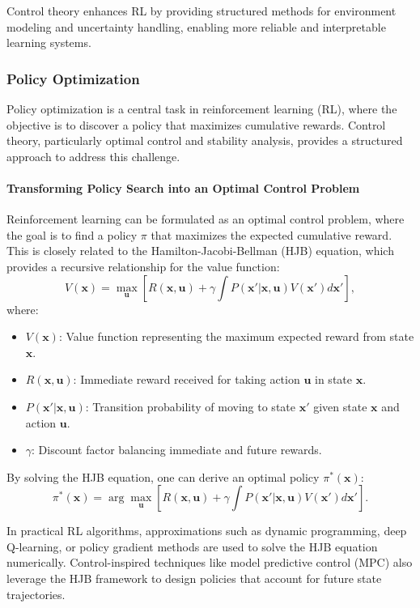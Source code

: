 \documentclass{IEEEojcsys}
\begin{document}
Control theory enhances RL by providing structured methods for environment modeling and uncertainty handling, enabling more reliable and interpretable learning systems.

\subsubsection{Policy Optimization}
Policy optimization is a central task in reinforcement learning (RL), where the objective is to discover a policy that maximizes cumulative rewards. Control theory, particularly optimal control and stability analysis, provides a structured approach to address this challenge.

\paragraph{Transforming Policy Search into an Optimal Control Problem}
Reinforcement learning can be formulated as an optimal control problem, where the goal is to find a policy $\pi$ that maximizes the expected cumulative reward. This is closely related to the Hamilton-Jacobi-Bellman (HJB) equation, which provides a recursive relationship for the value function:
\[
V(\mathbf{x}) = \max_{\mathbf{u}} \left[ R(\mathbf{x}, \mathbf{u}) + \gamma \int P(\mathbf{x}'|\mathbf{x}, \mathbf{u}) V(\mathbf{x}') d\mathbf{x}' \right],
\]
where:
\begin{itemize}
    \item $V(\mathbf{x})$: Value function representing the maximum expected reward from state $\mathbf{x}$.
    \item $R(\mathbf{x}, \mathbf{u})$: Immediate reward received for taking action $\mathbf{u}$ in state $\mathbf{x}$.
    \item $P(\mathbf{x}'|\mathbf{x}, \mathbf{u})$: Transition probability of moving to state $\mathbf{x}'$ given state $\mathbf{x}$ and action $\mathbf{u}$.
    \item $\gamma$: Discount factor balancing immediate and future rewards.
\end{itemize}

By solving the HJB equation, one can derive an optimal policy $\pi^*(\mathbf{x})$:
\[
\pi^*(\mathbf{x}) = \arg\max_{\mathbf{u}} \left[ R(\mathbf{x}, \mathbf{u}) + \gamma \int P(\mathbf{x}'|\mathbf{x}, \mathbf{u}) V(\mathbf{x}') d\mathbf{x}' \right].
\]

In practical RL algorithms, approximations such as dynamic programming, deep Q-learning, or policy gradient methods are used to solve the HJB equation numerically. Control-inspired techniques like model predictive control (MPC) also leverage the HJB framework to design policies that account for future state trajectories.
\end{document}
